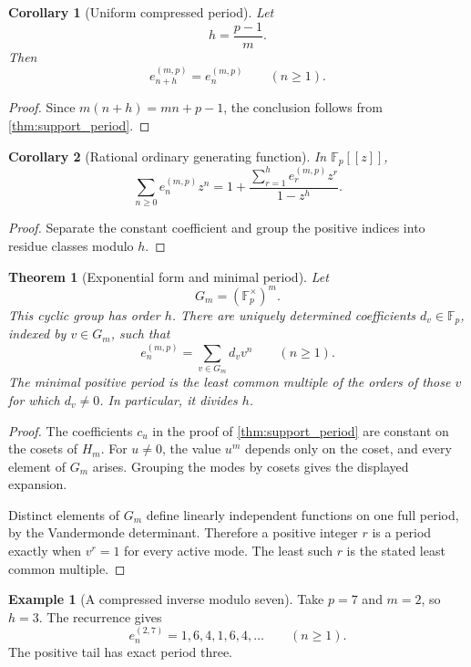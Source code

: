 \documentclass{aomart}
\newtheorem{theorem}{Theorem}[section]
\newtheorem{corollary}[corollary]{Corollary}
\theoremstyle{definition}
\newtheorem{example}[example]{Example}
\theoremstyle{remark}
\newcommand{\FF}{\mathbb F}
\begin{document}
\begin{corollary}[Uniform compressed period]\label{cor:compressed_period}
Let
\[
h=\frac{p-1}{m}.
\]
Then
\[
\boxed{
e_{n+h}^{(m,p)}
=
e_n^{(m,p)}
\qquad(n\geq1).
}
\]
\end{corollary}

\begin{proof}
Since \(m(n+h)=mn+p-1\), the conclusion follows from \cref{thm:support_period}.
\end{proof}

\begin{corollary}[Rational ordinary generating function]\label{cor:periodic_ogf}
In \(\FF_p[[z]]\),
\[
\boxed{
\sum_{n\geq0}e_n^{(m,p)}z^n
=
1+
\frac{
\sum_{r=1}^{h}e_r^{(m,p)}z^r
}{1-z^h}.
}
\]
\end{corollary}

\begin{proof}
Separate the constant coefficient and group the positive indices into residue classes modulo \(h\).
\end{proof}

\begin{theorem}[Exponential form and minimal period]\label{thm:minimal_period}
Let
\[
G_m=(\FF_p^\times)^m.
\]
This cyclic group has order \(h\). There are uniquely determined coefficients \(d_v\in\FF_p\), indexed by \(v\in G_m\), such that
\[
\boxed{
e_n^{(m,p)}
=
\sum_{v\in G_m}d_vv^n
\qquad(n\geq1).
}
\]
The minimal positive period is the least common multiple of the orders of those \(v\) for which \(d_v\neq0\). In particular, it divides \(h\).
\end{theorem}

\begin{proof}
The coefficients \(c_u\) in the proof of \cref{thm:support_period} are constant on the cosets of \(H_m\). For \(u\neq0\), the value \(u^m\) depends only on the coset, and every element of \(G_m\) arises. Grouping the modes by cosets gives the displayed expansion.

Distinct elements of \(G_m\) define linearly independent functions on one full period, by the Vandermonde determinant. Therefore a positive integer \(r\) is a period exactly when \(v^r=1\) for every active mode. The least such \(r\) is the stated least common multiple.
\end{proof}

\begin{example}[A compressed inverse modulo seven]\label{ex:compressed_mod_seven}
Take \(p=7\) and \(m=2\), so \(h=3\). The recurrence gives
\[
e_n^{(2,7)}
=
1,6,4,1,6,4,\ldots
\qquad(n\geq1).
\]
The positive tail has exact period three.
\end{example}
\end{document}
